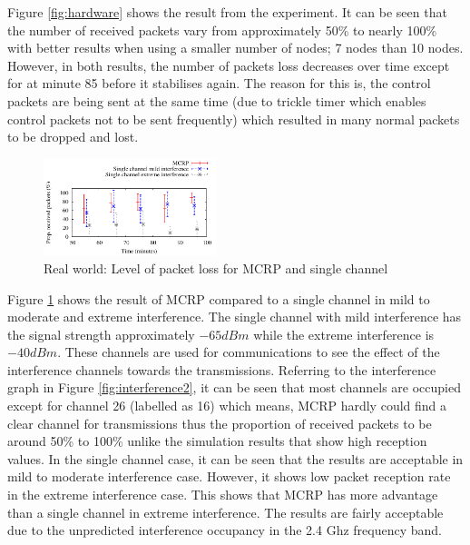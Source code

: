 Figure \ref{fig:hardware} shows the result from the experiment. It can be seen that the number of received packets vary from approximately 50\% to nearly 100\% with better results when using a smaller number of nodes; 7 nodes than 10 nodes. However, in both results, the number of packets loss decreases over time except for at minute 85 before it stabilises again. The reason for this is, the control packets are being sent at the same time (due to trickle timer which enables control packets not to be sent frequently) which resulted in many normal packets to be dropped and lost.

\begin{figure}
\centering
\includegraphics[width=0.45\textwidth]{figures/channels.pdf}
\caption{Real world: Level of packet loss for MCRP and single channel}
\label{fig:hardware2}
\end{figure}

Figure \ref{fig:hardware2} shows the result of MCRP compared to a single channel in mild to moderate and extreme interference. The single channel with mild interference has the signal strength approximately $-65 dBm$ while the extreme interference is $-40 dBm$. These channels are used for communications to see the effect of the interference channels towards the transmissions. Referring to the interference graph in Figure \ref{fig:interference2}, it can be seen that most channels are occupied except for channel 26 (labelled as 16) which means, MCRP hardly could find a clear channel for transmissions thus the proportion of received packets to be around 50\% to 100\% unlike the simulation results that show high reception values. In the single channel case, it can be seen that the results are acceptable in mild to moderate interference case. However, it shows low packet reception rate in the extreme interference case. This shows that MCRP has more advantage than a single channel in extreme interference. The results are fairly acceptable due to the unpredicted interference occupancy in the 2.4 Ghz frequency band.



